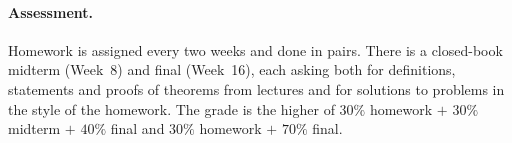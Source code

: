 \documentclass[a4paper,oneside]{scrbook}
\begin{document}
\paragraph{Assessment.}
Homework is assigned every two weeks and done in pairs. There is a closed-book
midterm (Week~8) and final (Week~16), each asking both for definitions,
statements and proofs of theorems from lectures and for solutions to problems
in the style of the homework. The grade is the higher of
\(30\%\) homework \(+\) \(30\%\) midterm \(+\) \(40\%\) final and
\(30\%\) homework \(+\) \(70\%\) final.

\newpage

\tableofcontents


\newpage

%

\end{document}
